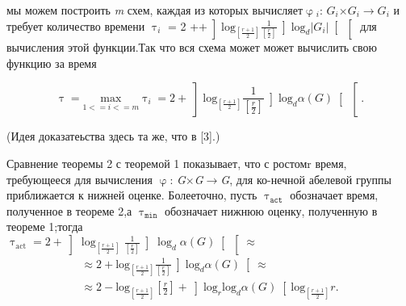 \documentclass[a4paper, twoside]{article}
\begin{document}
\voffset=0.57cm

\Large 

\begin{spacing}{0.9}
\noindent мы можем построить \textit{m} схем, каждая из которых вычисляет\linebreak[4] $\upvarphi$$_{i}$: $G_{i}$$\times$$G_{i}$$\rightarrow$$G_{i}$ и требует количество времени 
\Large $\uptau_{i}$ = 2 +\linebreak[4] $+ \left] \text{log}_{\left[\frac{r+1}{2}\right]}\frac{1}{\left[\frac{r}{2}\right]}\left]\text{log}_{d}|G_{i}|\right[ \right[$ \Large для вычисления этой функции.\linebreak[4] Так что вся схема может может вычислить свою функцию за время 

\[
 \uptau = \underset{1<=i<=m}{\text{max}}  \uptau _{i} = 2 + \left] \text{log}_{\left[\frac{r+1}{2}\right]}\frac{1}{\left[\frac{r}{2}\right]}\left]\text{log}_{d}\alpha(G)\right[ \right[.
\]

\noindent (Идея доказатеьства здесь та же, что в [3].)
\end{spacing}

\begin{spacing}{0.9}
\par Сравнение теоремы 2 с теоремой 1 показывает, что с ростом\linebreak[4] r время, требующееся для вычисления $\upvarphi$: \textit{G}$\times$\textit{G}$\rightarrow$\textit{G}, для ко-\linebreak[4] нечной абелевой группы приближается к нижней оценке. Более\linebreak[4] точно, пусть $\uptau_{\texttt{act}}$ обозначает время, полученное в теореме 2,\linebreak[4] а $\uptau_{\texttt{min}}$ обозначает нижнюю оценку, полученную в теореме 1;\linebreak[4] тогда \\
$\uptau_{\text{act}} = 2 + \left] \log_{\left[\frac{r+1}{2}\right]}\frac{1}{\left[\frac{r}{2}\right]}\left]\log_{d}\alpha(G)\right[ \right[ \approx$
\[
  \begin{gathered}
 \approx 2 + \text{log}_{\left[\frac{r+1}{2}\right]}\frac{1}{\left[\frac{r}{2}\right]}\left]\text{log}_{d}\alpha(G)\right[ \approx \\
 \approx 2 - \text{log}_{\left[\frac{r+1}{2}\right]}\left[\frac{r}{2}\right]+\left]\text{log}_{r}\text{log}_{d}\alpha(G)\right[\text{log}_{\left[\frac{r+1}{2}\right]}r.
 \end{gathered}
\]
\end{spacing}
\end{document}
